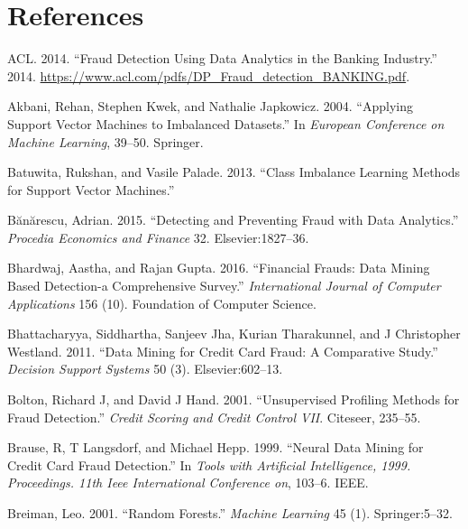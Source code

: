 \documentclass[12pt,]{article}
\begin{document}
\clearpage

\hypertarget{references}{%
\section*{References}\label{references}}

\hypertarget{refs}{}
\leavevmode\hypertarget{ref-fraudanalyticsacl}{}%
ACL. 2014. ``Fraud Detection Using Data Analytics in the Banking
Industry.'' 2014.
\url{https://www.acl.com/pdfs/DP_Fraud_detection_BANKING.pdf}.

\leavevmode\hypertarget{ref-akbani2004applying}{}%
Akbani, Rehan, Stephen Kwek, and Nathalie Japkowicz. 2004. ``Applying
Support Vector Machines to Imbalanced Datasets.'' In \emph{European
Conference on Machine Learning}, 39--50. Springer.

\leavevmode\hypertarget{ref-batuwita2013class}{}%
Batuwita, Rukshan, and Vasile Palade. 2013. ``Class Imbalance Learning
Methods for Support Vector Machines.''

\leavevmode\hypertarget{ref-buanuarescu2015detecting}{}%
Bănărescu, Adrian. 2015. ``Detecting and Preventing Fraud with Data
Analytics.'' \emph{Procedia Economics and Finance} 32.
Elsevier:1827--36.

\leavevmode\hypertarget{ref-bhardwaj2016financial}{}%
Bhardwaj, Aastha, and Rajan Gupta. 2016. ``Financial Frauds: Data Mining
Based Detection-a Comprehensive Survey.'' \emph{International Journal of
Computer Applications} 156 (10). Foundation of Computer Science.

\leavevmode\hypertarget{ref-bhattacharyya2011data}{}%
Bhattacharyya, Siddhartha, Sanjeev Jha, Kurian Tharakunnel, and J
Christopher Westland. 2011. ``Data Mining for Credit Card Fraud: A
Comparative Study.'' \emph{Decision Support Systems} 50 (3).
Elsevier:602--13.

\leavevmode\hypertarget{ref-bolton2001unsupervised}{}%
Bolton, Richard J, and David J Hand. 2001. ``Unsupervised Profiling
Methods for Fraud Detection.'' \emph{Credit Scoring and Credit Control
VII}. Citeseer, 235--55.

\leavevmode\hypertarget{ref-brause1999neural}{}%
Brause, R, T Langsdorf, and Michael Hepp. 1999. ``Neural Data Mining for
Credit Card Fraud Detection.'' In \emph{Tools with Artificial
Intelligence, 1999. Proceedings. 11th Ieee International Conference on},
103--6. IEEE.

\leavevmode\hypertarget{ref-breiman2001random}{}%
Breiman, Leo. 2001. ``Random Forests.'' \emph{Machine Learning} 45 (1).
Springer:5--32.
\end{document}
